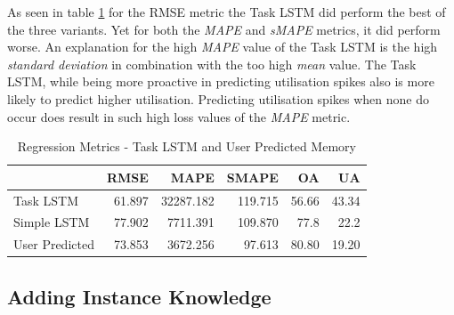       As seen in table \ref{tab:regression-metrics-task-lstm-user-predicted-memory} for the RMSE metric the Task LSTM did perform the best of the three variants. Yet for both the \emph{MAPE} and \emph{sMAPE} metrics, it did perform worse. An explanation for the high \emph{MAPE} value of the Task LSTM is the high \emph{standard deviation} in combination with the too high \emph{mean} value. The Task LSTM, while being more proactive in predicting utilisation spikes also is more likely to predict higher utilisation. Predicting utilisation spikes when none do occur does result in such high loss values of the \emph{MAPE} metric.
      
      \begin{table}
        \centering
        \caption{Regression Metrics - Task LSTM and User Predicted Memory}
        \label{tab:regression-metrics-task-lstm-user-predicted-memory}
        
        \begin{tabular}{|l|rrrrr|}
          \toprule
          {} &    RMSE &       MAPE &    SMAPE &     OA &     UA \\
          \midrule
          Task LSTM   &  61.897 &  32287.182 &  119.715 &  56.66 &  43.34 \\
          Simple LSTM &  77.902 &  7711.391 &  109.870 &  77.8 &  22.2 \\
          User Predicted &  73.853 &   3672.256 &   97.613 &  80.80 &  19.20 \\
          \bottomrule
        \end{tabular}
      \end{table}

  \subsection{Adding Instance Knowledge}
  \label{sec:adding-instance-knowledge-evaluation-scenarios}

